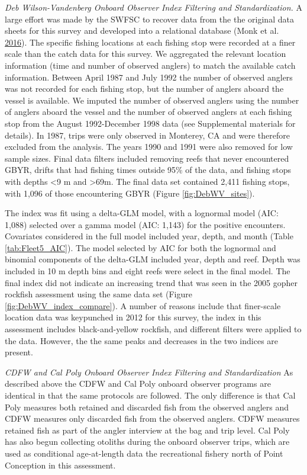 \documentclass[12pt,]{article}
\begin{document}
\emph{Deb Wilson-Vandenberg Onboard Observer Index Filtering and
Standardization.} A large effort was made by the SWFSC to recover data
from the the original data sheets for this survey and developed into a
relational database (Monk et al.
\protect\hyperlink{ref-Monk2016}{2016}). The specific fishing locations
at each fishing stop were recorded at a finer scale than the catch data
for this survey. We aggregated the relevant location information (time
and number of observed anglers) to match the available catch
information. Between April 1987 and July 1992 the number of observed
anglers was not recorded for each fishing stop, but the number of
anglers aboard the vessel is available. We imputed the number of
observed anglers using the number of anglers aboard the vessel and the
number of observed anglers at each fishing stop from the August
1992-December 1998 data (see Supplemental materials for details). In
1987, trips were only observed in Monterey, CA and were therefore
excluded from the analysis. The years 1990 and 1991 were also removed
for low sample sizes. Final data filters included removing reefs that
never encountered GBYR, drifts that had fishing times outside 95\% of
the data, and fishing stops with depths \textless{}9 m and
\textgreater{}69m. The final data set contained 2,411 fishing stops,
with 1,096 of those encountering GBYR (Figure \ref{fig:DebWV_sites}).

The index was fit using a delta-GLM model, with a lognormal model (AIC:
1,088) selected over a gamma model (AIC: 1,143) for the positive
encounters. Covariates considered in the full model included year,
depth, and month (Table \ref{tab:Fleet5_AIC}). The model selected by AIC
for both the lognormal and binomial components of the delta-GLM included
year, depth and reef. Depth was included in 10 m depth bins and eight
reefs were select in the final model. The final index did not indicate
an increasing trend that was seen in the 2005 gopher rockfish assessment
using the same data set (Figure \ref{fig:DebWV_index_compare}). A number
of reasons include that finer-scale location data was keypunched in 2012
for this survey, the index in this assessment includes black-and-yellow
rockfish, and different filters were applied to the data. However, the
the same peaks and decreases in the two indices are present.

\emph{CDFW and Cal Poly Onboard Observer Index Filtering and
Standardization} As described above the CDFW and Cal Poly onboard
observer programs are identical in that the same protocols are followed.
The only difference is that Cal Poly measures both retained and
discarded fish from the observed anglers and CDFW measures only
discarded fish from the observed anglers. CDFW measures retained fish as
part of the angler interview at the bag and trip level. Cal Poly has
also begun collecting otoliths during the onboard observer trips, which
are used as conditional age-at-length data the recreational fishery
north of Point Conception in this assessment.
\end{document}
